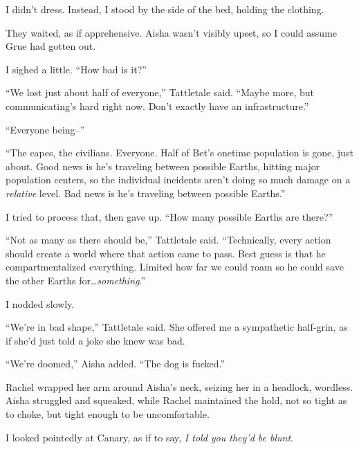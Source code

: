 I didn't dress.  Instead, I stood by the side of the bed, holding the clothing.



They waited, as if apprehensive.  Aisha wasn't visibly upset, so I could assume Grue had gotten out.



I sighed a little.  ``How bad is it?''



``We lost just about half of everyone,'' Tattletale said.  ``Maybe more, but communicating's hard right now.  Don't exactly have an infrastructure.''



``Everyone being--''



``The capes, the civilians.  Everyone.  Half of Bet's onetime population is gone, just about.  Good news is he's traveling between possible Earths, hitting major population centers, so the individual incidents aren't doing so much damage on a \emph{relative} level.  Bad news is he's traveling between possible Earths.''



I tried to process that, then gave up.  ``How many possible Earths are there?''



``Not as many as there should be,'' Tattletale said.  ``Technically, every action should create a world where that action came to pass.  Best guess is that he compartmentalized everything.  Limited how far we could roam so he could save the other Earths for\ldots \emph{something}.''



I nodded slowly.



``We're in bad shape,'' Tattletale said.  She offered me a sympathetic half-grin, as if she'd just told a joke she knew was bad.



``We're doomed,'' Aisha added.  ``The dog is fucked.''



Rachel wrapped her arm around Aisha's neck, seizing her in a headlock, wordless.  Aisha struggled and squeaked, while Rachel maintained the hold, not so tight as to choke, but tight enough to be uncomfortable.



I looked pointedly at Canary, as if to say, \emph{I told you they'd be blunt}.



